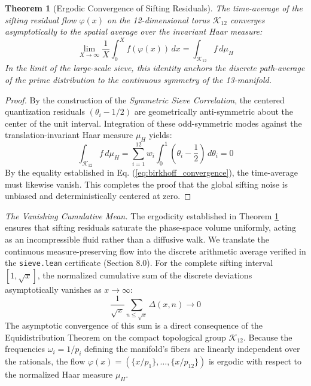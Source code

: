 \documentclass[sn-mathphys-num, pdflatex]{sn-jnl}
\newtheorem{theorem}{Theorem}[section]
\begin{document}
\begin{theorem}[Ergodic Convergence of Sifting Residuals]
\label{the:ergodic_convergence}
The time-average of the sifting residual flow $\varphi(x)$ on the 12-dimensional torus $\mathcal{K}_{12}$ converges asymptotically to the spatial average over the invariant Haar measure:
\begin{equation}
\lim_{X \to \infty} \frac{1}{X} \int_{0}^{X} f(\varphi(x)) \, dx = \int_{\mathcal{K}_{12}} f \, d\mu_H
\label{eq:birkhoff_convergence}
\end{equation}
In the limit of the large-scale sieve, this identity anchors the discrete path-average of the prime distribution to the continuous symmetry of the 13-manifold.
\end{theorem}

\begin{proof}
By the construction of the \textit{Symmetric Sieve Correlation}, the centered quantization residuals $(\theta_i - 1/2)$ are geometrically anti-symmetric about the center of the unit interval. Integration of these odd-symmetric modes against the translation-invariant Haar measure $\mu_H$ yields:
\begin{equation}
\int_{\mathcal{K}_{12}} f \, d\mu_H = \sum_{i=1}^{12} w_i \int_{0}^{1} \left( \theta_i - \frac{1}{2} \right) \, d\theta_i = 0
\end{equation}
By the equality established in Eq. (\ref{eq:birkhoff_convergence}), the time-average must likewise vanish. This completes the proof that the global sifting noise is unbiased and deterministically centered at zero.
\end{proof}

\noindent \textit{The Vanishing Cumulative Mean.}
The ergodicity established in Theorem \ref{the:ergodic_convergence} ensures that sifting residuals saturate the phase-space volume uniformly, acting as an incompressible fluid rather than a diffusive walk. We translate the continuous measure-preserving flow into the discrete arithmetic average verified in the \texttt{sieve.lean} certificate (Section 8.0). For the complete sifting interval $[1, \sqrt{x}]$, the normalized cumulative sum of the discrete deviations asymptotically vanishes as $x \to \infty$:
\begin{equation}
\frac{1}{\sqrt{x}} \sum_{n \le \sqrt{x}} \Delta(x, n) \to 0
\label{eq:final_ergodic_sum}
\end{equation}
The asymptotic convergence of this sum is a direct consequence of the Equidistribution Theorem \cite{Kuipers2012} on the compact topological group $\mathcal{K}_{12}$. Because the frequencies $\omega_i = 1/p_i$ defining the manifold's fibers are linearly independent over the rationals, the flow $\varphi(x) = ( \{x/p_1\}, \dots, \{x/p_{12}\} )$ is ergodic with respect to the normalized Haar measure $\mu_H$. 
\end{document}
